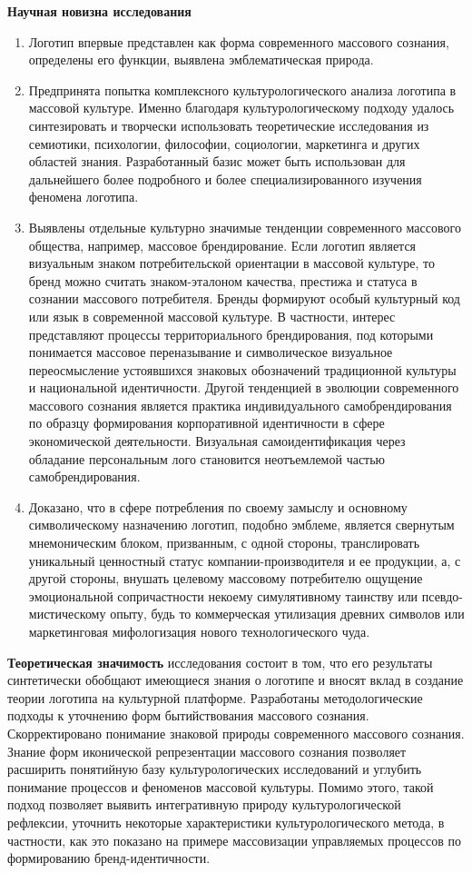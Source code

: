 \textbf{Научная новизна исследования}
\begin{enumerate}
\item Логотип впервые представлен как форма современного массового сознания, определены его функции, выявлена эмблематическая природа.
\item Предпринята попытка комплексного культурологического анализа логотипа в массовой культуре. Именно благодаря культурологическому подходу удалось синтезировать и творчески использовать теоретические исследования из семиотики, психологии, философии, социологии, маркетинга и других областей знания. Разработанный базис может быть использован для дальнейшего более подробного и более специализированного изучения феномена логотипа.
\item Выявлены отдельные культурно значимые тенденции современного массового общества, например, массовое брендирование. Если логотип является визуальным знаком потребительской ориентации в массовой культуре, то бренд можно считать знаком-эталоном качества, престижа и статуса в сознании массового потребителя. Бренды формируют особый культурный код или язык в современной массовой культуре. В частности, интерес представляют процессы территориального брендирования, под которыми понимается массовое переназывание и символическое визуальное переосмысление устоявшихся знаковых обозначений традиционной культуры и национальной идентичности. Другой тенденцией в эволюции современного массового сознания является практика индивидуального самобрендирования по образцу формирования корпоративной идентичности в сфере экономической деятельности. Визуальная самоидентификация через обладание персональным лого становится неотъемлемой частью самобрендирования.
\item Доказано, что в сфере потребления по своему замыслу и основному символическому назначению логотип, подобно эмблеме, является свернутым мнемоническим блоком, призванным, с одной стороны, транслировать уникальный ценностный статус компании-производителя и ее продукции, а, с другой стороны, внушать целевому массовому потребителю ощущение эмоциональной сопричастности некоему симулятивному таинству или псевдо-мистическому опыту, будь то коммерческая утилизация древних символов или маркетинговая мифологизация нового технологического чуда.
\end{enumerate}

\textbf{Теоретическая значимость} исследования состоит в том, что его результаты синтетически обобщают имеющиеся знания о логотипе и вносят вклад в создание теории логотипа на культурной платформе. Разработаны методологические подходы к уточнению форм бытийствования массового сознания. Скорректировано понимание знаковой природы современного массового сознания. Знание форм иконической репрезентации массового сознания позволяет расширить понятийную базу культурологических исследований и углубить понимание процессов и феноменов массовой культуры. Помимо этого, такой подход позволяет выявить интегративную природу культурологической рефлексии, уточнить некоторые характеристики культурологического метода, в частности, как это показано на примере массовизации управляемых процессов по формированию бренд-идентичности.

